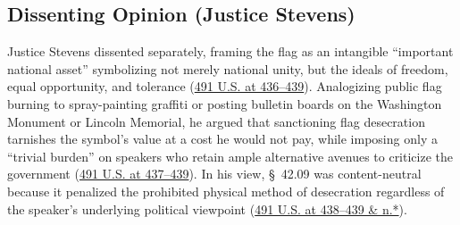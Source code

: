 \documentclass[12pt]{article}
\begin{document}
\subsection{Dissenting Opinion (Justice Stevens)}
Justice Stevens dissented separately, framing the flag as an intangible ``important national asset'' symbolizing not merely national unity, but the ideals of freedom, equal opportunity, and tolerance (\href{https://supreme.justia.com/cases/federal/us/491/397/}{491 U.S. at 436--439}). Analogizing public flag burning to spray-painting graffiti or posting bulletin boards on the Washington Monument or Lincoln Memorial, he argued that sanctioning flag desecration tarnishes the symbol's value at a cost he would not pay, while imposing only a ``trivial burden'' on speakers who retain ample alternative avenues to criticize the government (\href{https://supreme.justia.com/cases/federal/us/491/397/}{491 U.S. at 437--439}). In his view, \S~42.09 was content-neutral because it penalized the prohibited physical method of desecration regardless of the speaker's underlying political viewpoint (\href{https://supreme.justia.com/cases/federal/us/491/397/}{491 U.S. at 438--439 \& n.*}).
\end{document}
